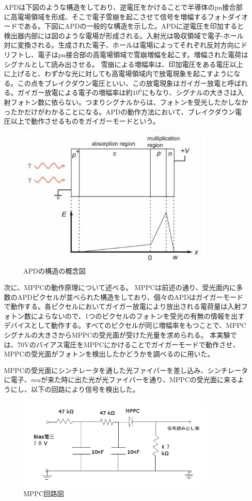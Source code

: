 APDは下図のような構造をしており、逆電圧をかけることで半導体のpn接合部に高電場領域を形成、そこで電子雪崩を起こさせて信号を増幅するフォトダイオードである。下図にAPDの一般的な構造を示した。APDに逆電圧を印加すると検出器内部には図のような電場が形成される。入射光は吸収領域で電子-ホール対に変換される。生成された電子、ホールは電場によってそれぞれ反対方向にドリフトし、電子はpn接合部の高電場領域で雪崩増幅を起こす。増幅された電荷はシグナルとして読み出させる。
雪崩による増幅率は、印加電圧をある電圧以上に上げると、わずかな光に対しても高電場領域内で放電現象を起こすようになる。この点をブレイクダウン電圧といい、この放電現象はガイガー放電と呼ばれる。ガイガー放電による電子の増幅率は約$10^6$にもなり、シグナルの大きさは入射フォトン数に依らない。つまりシグナルからは、フォトンを受光したかしなかったかだけがわかることになる。APDの動作方法において、ブレイクダウン電圧以上で動作させるものをガイガーモードという。
\begin{figure}[H]
 \centering
 \includegraphics[width=100mm,bb=0 0 513 360]{MPPC1.jpg}
 \caption{APDの構造の概念図}
\end{figure}
次に、MPPCの動作原理について述べる。
MPPCは前述の通り、受光面内に多数のAPDピクセルが並べられた構造をしており、個々のAPDはガイガーモードで動作する。各ピクセルにおいてガイガー放電により放出される電荷量は入射フォトン数によらないので、1つのピクセルのフォトンを受光の有無の情報を出すデバイスとして動作する。すべてのピクセルが同じ増幅率をもつことで、MPPCシグナルの大きさからMPPCの受光面が受けた光量を求められる。
本実験では、70Vのバイアス電圧をMPPCにかけることでガイガーモードで動作させ、MPPCの受光面がフォトンを検出したかどうかを調べるのに用いた。

MPPCの受光面にシンチレータを通した光ファイバーを差し込み、シンチレータに電子、$mu$が来た時に出た光が光ファイバーを通り、MPPCの受光面に来るようにし、以下の回路により信号を検出した。
\begin{figure}[H]
 \centering
 \includegraphics[width=100mm,bb=0 0 640 300]{MPPC2.jpg}
 \caption{MPPC回路図}
\end{figure}
